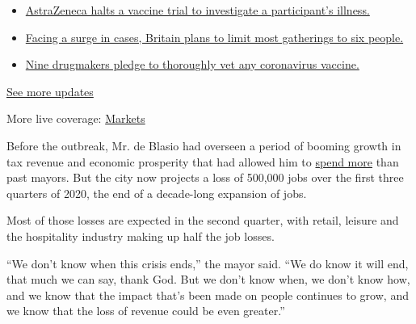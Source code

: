 \begin{itemize}
\tightlist
\item
  \href{https://www.nytimes3xbfgragh.onion/2020/09/08/world/covid-19-coronavirus.html?action=click\&pgtype=Article\&state=default\&region=MAIN_CONTENT_1\&context=storylines_live_updates\#link-313b443d}{AstraZeneca
  halts a vaccine trial to investigate a participant's illness.}
\item
  \href{https://www.nytimes3xbfgragh.onion/2020/09/08/world/covid-19-coronavirus.html?action=click\&pgtype=Article\&state=default\&region=MAIN_CONTENT_1\&context=storylines_live_updates\#link-4438dd7}{Facing
  a surge in cases, Britain plans to limit most gatherings to six
  people.}
\item
  \href{https://www.nytimes3xbfgragh.onion/2020/09/08/world/covid-19-coronavirus.html?action=click\&pgtype=Article\&state=default\&region=MAIN_CONTENT_1\&context=storylines_live_updates\#link-679303d7}{Nine
  drugmakers pledge to thoroughly vet any coronavirus vaccine.}
\end{itemize}

\href{https://www.nytimes3xbfgragh.onion/2020/09/08/world/covid-19-coronavirus.html?action=click\&pgtype=Article\&state=default\&region=MAIN_CONTENT_1\&context=storylines_live_updates}{See
more updates}

More live coverage:
\href{https://www.nytimes3xbfgragh.onion/live/2020/09/08/business/stock-market-today-coronavirus?action=click\&pgtype=Article\&state=default\&region=MAIN_CONTENT_1\&context=storylines_live_updates}{Markets}

Before the outbreak, Mr. de Blasio had overseen a period of booming
growth in tax revenue and economic prosperity that had allowed him to
\href{https://www.nytimes3xbfgragh.onion/2016/10/12/nyregion/bill-de-blasio-government-jobs.html}{spend
more} than past mayors. But the city now projects a loss of 500,000 jobs
over the first three quarters of 2020, the end of a decade-long
expansion of jobs.

Most of those losses are expected in the second quarter, with retail,
leisure and the hospitality industry making up half the job losses.

``We don't know when this crisis ends,'' the mayor said. ``We do know it
will end, that much we can say, thank God. But we don't know when, we
don't know how, and we know that the impact that's been made on people
continues to grow, and we know that the loss of revenue could be even
greater.''

